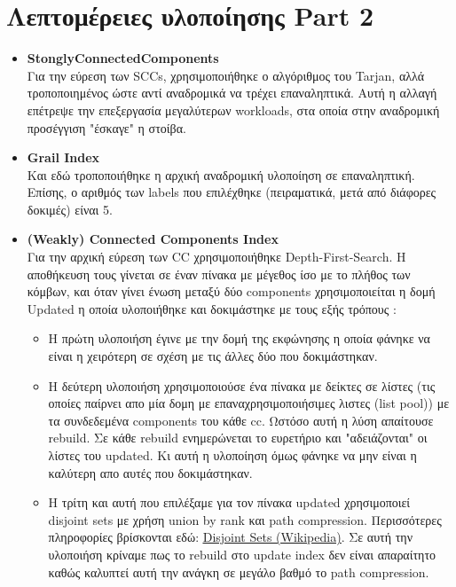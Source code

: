 \documentclass[11pt]{article}
\begin{document}
\section{Λεπτομέρειες υλοποίησης Part 2}
\begin{itemize}
\item \textbf{StonglyConnectedComponents}\\
Για την εύρεση των SCCs, χρησιμοποιήθηκε ο αλγόριθμος του Tarjan, αλλά τροποποιημένος ώστε αντί αναδρομικά να τρέχει επαναληπτικά. Αυτή η αλλαγή επέτρεψε την επεξεργασία μεγαλύτερων workloads, στα οποία στην αναδρομική προσέγγιση "έσκαγε" η στοίβα.
\item \textbf{Grail Index}\\
Και εδώ τροποποιήθηκε η αρχική αναδρομική υλοποίηση σε επαναληπτική. Επίσης, ο αριθμός των labels που επιλέχθηκε (πειραματικά, μετά από διάφορες δοκιμές) είναι 5.
\item \textbf{(Weakly) Connected Components Index}\\
Για την αρχική εύρεση των CC χρησιμοποιήθηκε Depth-First-Search. Η αποθήκευση τους γίνεται σε έναν πίνακα με μέγεθος ίσο με το πλήθος των κόμβων, και όταν γίνει ένωση μεταξύ δύο components χρησιμοποιείται η δομή Updated η οποία υλοποιήθηκε και δοκιμάστηκε με τους εξής τρόπους :
\begin{itemize}
\item H πρώτη υλοποιήση έγινε με την δομή της εκφώνησης η οποία φάνηκε να είναι η χειρότερη σε σχέση με τις άλλες δύο που δοκιμάστηκαν.
\item Η δεύτερη υλοποιήση χρησιμοποιούσε ένα πίνακα με δείκτες σε λίστες (τις οποίες παίρνει απο μία δομη με επαναχρησιμοποιήσιμες λιστες (list pool)) με τα συνδεδεμένα components του κάθε cc. Ωστόσο αυτή η λύση απαίτουσε rebuild. Σε κάθε rebuild ενημερώνεται το ευρετήριο και "αδειάζονται" οι λίστες του updated. Κι αυτή η υλοποίηση όμως φάνηκε να μην είναι η καλύτερη απο αυτές που δοκιμάστηκαν.
\item Η τρίτη και αυτή που επιλέξαμε για τον πίνακα updated χρησιμοποιεί disjoint sets με χρήση union by rank και path compression. Περισσότερες πληροφορίες βρίσκονται εδώ: {\color{blue}\underline{\href{https://en.wikipedia.org/wiki/Disjoint-set\_data\_structure\#Union\_by\_rank}{Disjoint Sets (Wikipedia)}}}. Σε αυτή την υλοποιήση κρίναμε πως το rebuild στο update index δεν είναι απαραίτητο καθώς καλυπτεί αυτή την ανάγκη σε μεγάλο βαθμό το path compression.
\end{itemize}
\end{itemize}
\end{document}
